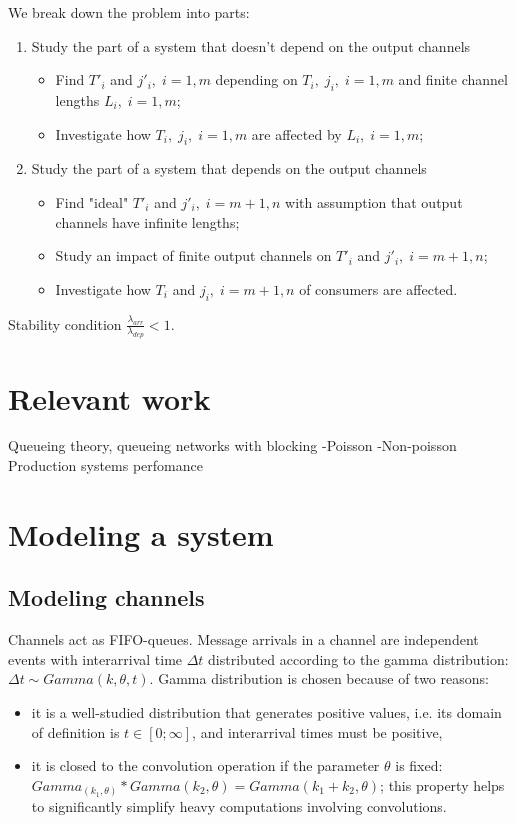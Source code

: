 We break down the problem into parts:
  \begin{enumerate}
  \item Study the part of a system that doesn't depend on the output channels
    \begin{itemize}
    \item Find $T'_{i}$ and $j'_{i}, \; i=1,m$ depending on $T_{i}, \; j_{i}, \; i=1,m$ and finite channel lengths $L_{i}, \; i=1,m$;
    \item Investigate how $T_{i}, \; j_{i}, \; i=1,m$ are affected by $L_{i}, \; i=1,m$;
  \end{itemize}

  \item Study the part of a system that depends on the output channels
    \begin{itemize}
    \item Find "ideal" $T'_{i}$ and $j'_{i}, \; i=m+1,n$ with assumption that output channels have infinite lengths;
    \item Study an impact of finite output channels on $T'_{i}$ and $j'_{i}, \; i=m+1,n$;
    \item Investigate how $T_{i}$ and $j_{i}, \; i=m+1,n$ of consumers are affected.
    \end{itemize}
  \end{enumerate}


Stability condition $\frac{\lambda_{arr}}{\lambda_{dep}} < 1$.
\section{Relevant work}


Queueing theory, queueing networks with blocking
-Poisson
-Non-poisson
Production systems perfomance


\section{Modeling a system}

  \subsection{Modeling channels}
Channels act as FIFO-queues. Message arrivals in a channel are independent events with interarrival time $\Delta t$ distributed according to the gamma distribution: $\Delta t \sim Gamma (k, \theta, t)$. Gamma distribution is chosen because of two reasons:
    \begin{itemize}
    \item it is a well-studied distribution that generates positive values, i.e. its domain of definition is $t \in [0;\infty]$, and interarrival times must be positive,
    \item it is closed to the convolution operation if the parameter $\theta$ is fixed: $Gamma_(k_{1}, \theta) * Gamma (k_{2}, \theta) = Gamma (k_{1} + k_{2}, \theta)$; this property helps to significantly simplify heavy computations involving convolutions.
    \end{itemize}

